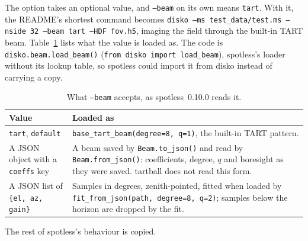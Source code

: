 \documentclass[11pt,a4paper]{article}
\begin{document}
The option takes an optional value, and \texttt{--beam} on its own means
\texttt{tart}. With it, the README's shortest command becomes
\texttt{disko --ms test\_data/test.ms --nside 32 --beam tart --HDF fov.h5},
imaging the field through the built-in TART beam.
Table~\ref{tab:beamvalues} lists what the value is loaded as. The code is
\texttt{disko.beam.load\_beam()} (\texttt{from disko import load\_beam}),
spotless's loader without its lookup table, so spotless could import it from
disko instead of carrying a copy.

\begin{table}[t]
  \centering
  \caption{What \texttt{--beam} accepts, as spotless~0.10.0 reads it.}
  \label{tab:beamvalues}
  \begin{tabular}{@{}p{}p{}@{}}
    \toprule
    Value & Loaded as \\
    \midrule
    \texttt{tart}, \texttt{default} &
    \texttt{base\_tart\_beam(degree=8, q=1)}, the built-in TART pattern. \\
    A JSON object with a \texttt{coeffs} key &
    A beam saved by \texttt{Beam.to\_json()} and read by
    \texttt{Beam.from\_json()}: coefficients, degree, $q$ and boresight as
    they were saved. tartball does not read this form. \\
    A JSON list of \texttt{\{el, az, gain\}} &
    Samples in degrees, zenith-pointed, fitted when loaded by
    \texttt{fit\_from\_json(path, degree=8, q=2)}; samples below the horizon
    are dropped by the fit. \\
    \bottomrule
  \end{tabular}
\end{table}

The rest of spotless's behaviour is copied.
\end{document}
